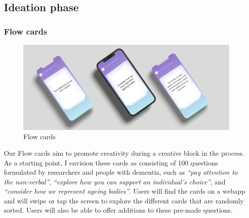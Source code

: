 \subsection{Ideation phase}
\subsubsection{Flow cards}
\begin{figure}[h]
\centering
\includegraphics[width=1\linewidth]{Images/D3Toolkit/Fig8.png}
\caption{Flow cards}
\label{fig:FlowCards}
\end{figure}
Our Flow cards aim to promote creativity during a creative block in the process. As a starting point, I envision these cards as consisting of 100 questions formulated by researchers and people with dementia, such as \textit{``pay attention to the non-verbal''}, \textit{``explore how you can support an individual’s choice''}, and \textit{``consider how we represent ageing bodies''}. Users will find the cards on a webapp and will swipe or tap the screen to explore the different cards that are randomly sorted. Users will also be able to offer additions to these pre-made questions. 

